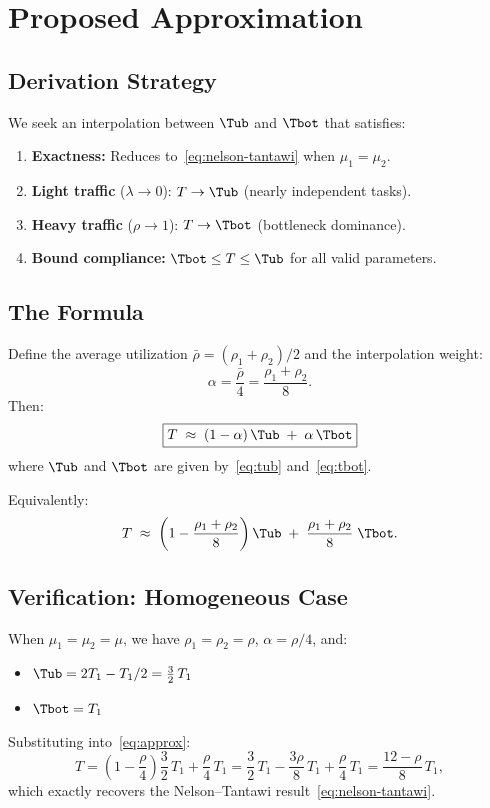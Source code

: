 \section{Proposed Approximation}
\label{sec:approx}

\subsection{Derivation Strategy}

We seek an interpolation between $\Tub$ and $\Tbot$ that satisfies:
\begin{enumerate}
\item \textbf{Exactness:} Reduces to~\eqref{eq:nelson-tantawi} when $\mu_1 = \mu_2$.
\item \textbf{Light traffic} ($\lambda \to 0$): $T \to \Tub$ (nearly independent tasks).
\item \textbf{Heavy traffic} ($\rho \to 1$): $T \to \Tbot$ (bottleneck dominance).
\item \textbf{Bound compliance:} $\Tbot \leq T \leq \Tub$ for all valid parameters.
\end{enumerate}

\subsection{The Formula}

Define the average utilization $\bar{\rho} = (\rho_1 + \rho_2)/2$ and the interpolation weight:
\begin{equation}
\alpha = \frac{\bar{\rho}}{4} = \frac{\rho_1 + \rho_2}{8}.
\end{equation}
Then:
\begin{equation}
\label{eq:approx}
\boxed{T \;\approx\; (1 - \alpha)\, \Tub \;+\; \alpha\, \Tbot}
\end{equation}
where $\Tub$ and $\Tbot$ are given by~\eqref{eq:tub} and~\eqref{eq:tbot}.

Equivalently:
\begin{equation}
T \;\approx\; \left(1 - \frac{\rho_1 + \rho_2}{8}\right) \Tub \;+\; \frac{\rho_1 + \rho_2}{8}\; \Tbot.
\end{equation}

\subsection{Verification: Homogeneous Case}

When $\mu_1 = \mu_2 = \mu$, we have $\rho_1 = \rho_2 = \rho$, $\alpha = \rho/4$, and:
\begin{itemize}
\item $\Tub = 2T_1 - T_1/2 = \tfrac{3}{2}\, T_1$
\item $\Tbot = T_1$
\end{itemize}
Substituting into~\eqref{eq:approx}:
\begin{equation}
T = \left(1 - \frac{\rho}{4}\right)\frac{3}{2}\,T_1 + \frac{\rho}{4}\, T_1 = \frac{3}{2}\,T_1 - \frac{3\rho}{8}\,T_1 + \frac{\rho}{4}\,T_1 = \frac{12 - \rho}{8}\, T_1,
\end{equation}
which exactly recovers the Nelson--Tantawi result~\eqref{eq:nelson-tantawi}.

